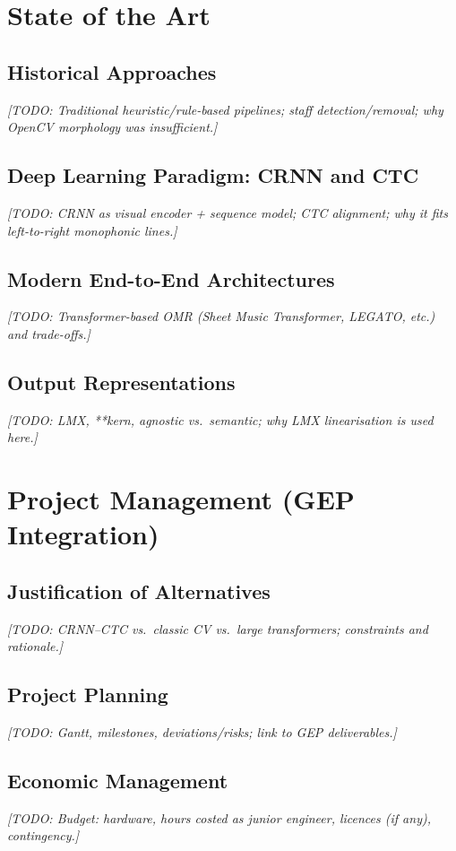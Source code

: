 \documentclass[11pt, a4paper]{report}
\begin{document}
\chapter{State of the Art}
\label{ch:soa}
\section{Historical Approaches}
\textit{[TODO: Traditional heuristic/rule-based pipelines; staff detection/removal; why OpenCV morphology was insufficient.]}

\section{Deep Learning Paradigm: CRNN and CTC}
\textit{[TODO: CRNN as visual encoder + sequence model; CTC alignment; why it fits left-to-right monophonic lines.]}

\section{Modern End-to-End Architectures}
\textit{[TODO: Transformer-based OMR (Sheet Music Transformer, LEGATO, etc.) and trade-offs.]}

\section{Output Representations}
\textit{[TODO: LMX, **kern, agnostic vs.\ semantic; why LMX linearisation is used here.]}


\chapter{Project Management (GEP Integration)}
\label{ch:mgmt}
\section{Justification of Alternatives}
\textit{[TODO: CRNN--CTC vs.\ classic CV vs.\ large transformers; constraints and rationale.]}

\section{Project Planning}
\textit{[TODO: Gantt, milestones, deviations/risks; link to GEP deliverables.]}

\section{Economic Management}
\textit{[TODO: Budget: hardware, hours costed as junior engineer, licences (if any), contingency.]}
\end{document}

